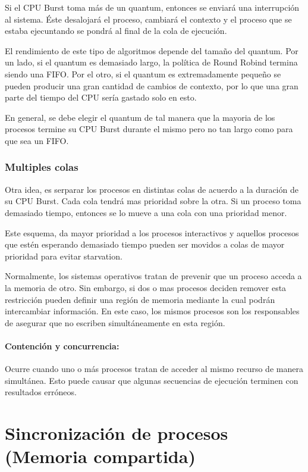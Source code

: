 	Si el CPU Burst toma más de un quantum, entonces se enviará una interrupción al sistema. Éste desalojará el proceso, cambiará el contexto y el proceso que se estaba ejecuntando se pondrá al final de la cola de ejecución.
	
	El rendimiento de este tipo de algoritmos depende del tamaño del quantum. Por un lado, si el quantum es demasiado largo, la política de Round Robind termina siendo una FIFO. Por el otro, si el quantum es extremadamente pequeño se pueden producir una gran cantidad de cambios de contexto, por lo que una gran parte del tiempo del CPU sería gastado solo en esto.
	
	En general, se debe elegir el quantum de tal manera que la mayoria de los procesos termine su CPU Burst durante el mismo pero no tan largo como para que sea un FIFO.
	
	\subsubsection{Multiples colas}
	Otra idea, es serparar los procesos en distintas colas de acuerdo a la duración de su CPU Burst. Cada cola tendrá mas prioridad sobre la otra. Si un proceso toma demasiado tiempo, entonces se lo mueve a una cola con una prioridad menor. 
	
	Este esquema, da mayor prioridad a los procesos interactivos y aquellos procesos que estén esperando demasiado tiempo pueden ser movidos a colas de mayor prioridad para evitar starvation.

\newpage
Normalmente, los sistemas operativos tratan de prevenir que un proceso acceda a la memoria de otro. Sin embargo, si dos o mas procesos deciden remover esta restricción pueden definir una región de memoria mediante la cual podrán intercambiar información. En este caso, los mismos procesos son los responsables de asegurar que no escriben simultáneamente en esta región.

\paragraph{Contención y concurrencia:} Ocurre cuando uno o más procesos tratan de acceder al mismo recurso de manera simultánea. Esto puede causar que algunas secuencias de ejecución terminen con resultados erróneos.

\printbibliography[keyword=scheduling,title=Bibliografía]

\newpage
\section{Sincronización de procesos (Memoria compartida)}
